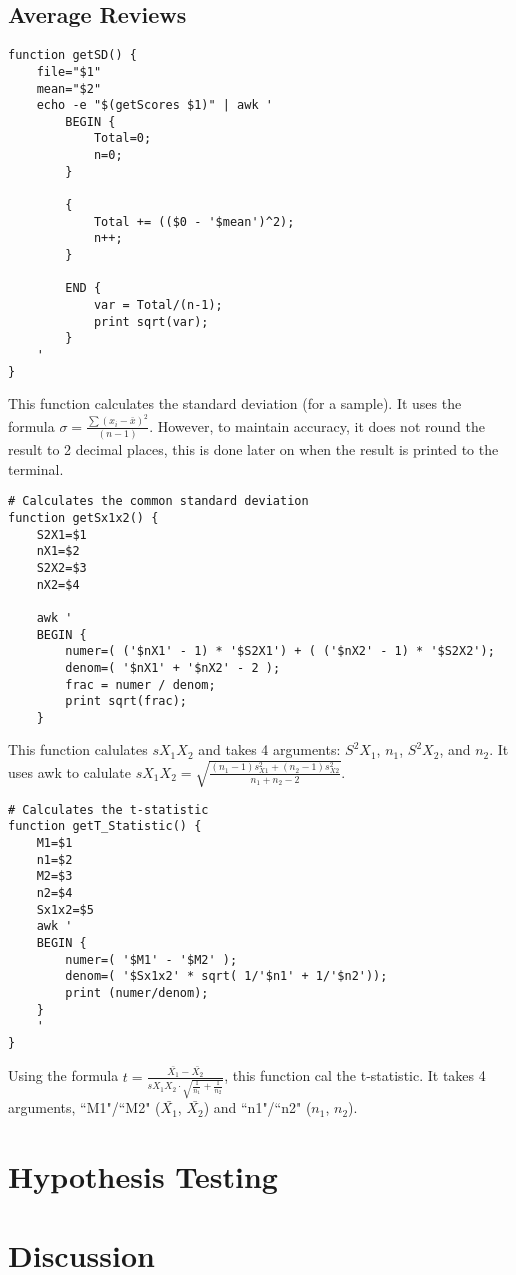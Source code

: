 \documentclass[a4paper]{article}
\begin{document}
%
\newpage
\subsection{Average Reviews}

\begin{lstlisting}
function getSD() {
	file="$1"
	mean="$2"
	echo -e "$(getScores $1)" | awk '
		BEGIN {
			Total=0;
			n=0;
		}

		{
			Total += (($0 - '$mean')^2);
			n++;
		}

		END {
			var = Total/(n-1);
			print sqrt(var);
		}
	'
}
\end{lstlisting}
This function calculates the standard deviation (for a sample).
It uses the formula $\sigma = \frac{\sum{(x_i - \bar{x})^2}}{(n-1)}$.
However, to maintain accuracy, it does not round the result to 2 decimal places, this is done later on when the result is printed to the terminal.

\begin{lstlisting}
# Calculates the common standard deviation
function getSx1x2() {
	S2X1=$1
	nX1=$2
	S2X2=$3
	nX2=$4
	
	awk '
	BEGIN {
		numer=( ('$nX1' - 1) * '$S2X1') + ( ('$nX2' - 1) * '$S2X2');
		denom=( '$nX1' + '$nX2' - 2 );
		frac = numer / denom;
		print sqrt(frac);
	}
\end{lstlisting}
This function calulates $s X_1 X_2$ and takes 4 arguments: $S^2X_1$, $n_1$, $S^2X_2$, and  $n_2$.
It uses awk to calulate $s X_1 X_2 = \sqrt{\frac{(n_1 - 1)s^{2}_{X1} + (n_2 - 1)s^{2}_{X2}}{n_1 + n_2 - 2}}$.

\begin{lstlisting}
# Calculates the t-statistic
function getT_Statistic() {
	M1=$1
	n1=$2
	M2=$3
	n2=$4
	Sx1x2=$5
	awk '
	BEGIN {
		numer=( '$M1' - '$M2' );
		denom=( '$Sx1x2' * sqrt( 1/'$n1' + 1/'$n2'));
		print (numer/denom);
	}
	'
}
\end{lstlisting}
Using the formula $t = \frac{\bar{X_1} - \bar{X_2}}{s X_1 X_2 \cdot \sqrt{\frac{1}{n_1} + \frac{1}{n_2}}}$, this function cal the t-statistic.
It takes 4 arguments, ``M1"/``M2" ($\bar{X_1}$, $\bar{X_2}$) and ``n1"/``n2" ($n_1$, $n_2$).

\newpage
\section{Hypothesis Testing}

\newpage
\section{Discussion}
\end{document}
